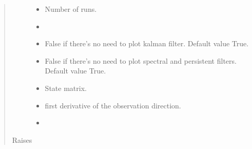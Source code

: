 \documentclass[letterpaper,10pt,english]{sphinxmanual}
\begin{document}
\begin{fulllineitems}
\begin{quote}
\begin{description}
\begin{itemize}
\item {} 
\sphinxAtStartPar
{} \textendash{} Number of runs.

\item {} 
\sphinxAtStartPar
{} \textendash{} 

\item {} 
\sphinxAtStartPar
{} \textendash{} False if there’s no need to plot kalman filter.
Default value \sphinxhyphen{} True.

\item {} 
\sphinxAtStartPar
{} \textendash{} False if there’s no need to plot spectral and persistent filters.
Default value \sphinxhyphen{} True.

\item {} 
\sphinxAtStartPar
{} \textendash{} State matrix.

\item {} 
\sphinxAtStartPar
{} \textendash{} first derivative of the observation direction.

\item {} 
\sphinxAtStartPar
{} \textendash{} 

\end{itemize}

\item[{Raises}] \leavevmode
\sphinxAtStartPar
{} \textendash{} 

\end{description}\end{quote}

\end{fulllineitems}

\end{document}
